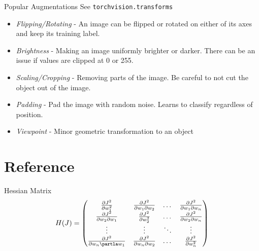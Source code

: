 \documentclass[11pt,a4paper]{article}
\begin{document}
  \begin{proposition}{Popular Augmentations}
    See \texttt{torchvision.transforms}
    \begin{itemize}
      \item \textit{Flipping/Rotating} - An image can be flipped or rotated on either of its axes and keep its training label.
      \item \textit{Brightness} - Making an image uniformly brighter or darker. There can be an issue if values are clipped at 0 or 255.
      \item \textit{Scaling/Cropping} - Removing parts of the image. Be careful to not cut the object out of the image.
      \item \textit{Padding} - Pad the image with random noise. Learns to classify regardless of position.
      \item \textit{Viewpoint} - Minor geometric transformation to an object
    \end{itemize}
  \end{proposition}

\newpage
\setcounter{section}{-1}
\section{Reference}

\begin{definition}{Hessian Matrix}
  \[ H(J)=\begin{pmatrix}\frac{\partial J^2}{\partial w_1^2}&\frac{\partial J^2}{\partial w_1\partial w_2}&\dots&\frac{\partial J^2}{\partial w_1\partial w_n}\\\frac{\partial J^2}{\partial w_2\partial w_1}&\frac{\partial J^2}{\partial w_2^2}&\dots&\frac{\partial J^2}{\partial w_2\partial w_n}\\\vdots&\vdots&\ddots&\vdots\\\frac{\partial J^2}{\partial w_n\partla w_1}&\frac{\partial J^2}{\partial w_n\partial w_2}&\dots&\frac{\partial J^2}{\partial w_n^2}\end{pmatrix}\]
\end{definition}
\end{document}
